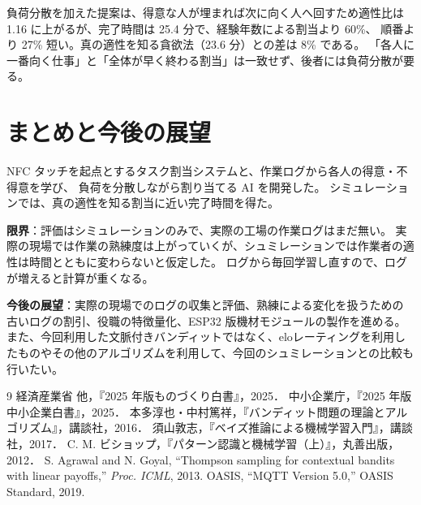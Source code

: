 \documentclass[a4paper,10pt,twocolumn,autodetect-engine,ja=standard]{bxjsarticle}
\begin{document}
負荷分散を加えた提案は、得意な人が埋まれば次に向く人へ回すため適性比は 1.16 に上がるが、完了時間は 25.4 分で、経験年数による割当より 60\%、
順番より 27\% 短い。真の適性を知る貪欲法（23.6 分）との差は 8\% である。
「各人に一番向く仕事」と「全体が早く終わる割当」は一致せず、後者には負荷分散が要る。

\section{まとめと今後の展望}
NFC タッチを起点とするタスク割当システムと、作業ログから各人の得意・不得意を学び、
負荷を分散しながら割り当てる AI を開発した。
シミュレーションでは、真の適性を知る割当に近い完了時間を得た。

\textbf{限界}：評価はシミュレーションのみで、実際の工場の作業ログはまだ無い。
実際の現場では作業の熟練度は上がっていくが、シュミレーションでは作業者の適性は時間とともに変わらないと仮定した。
ログから毎回学習し直すので、ログが増えると計算が重くなる。


\textbf{今後の展望}：実際の現場でのログの収集と評価、熟練による変化を扱うための
古いログの割引、役職の特徴量化、ESP32 版機材モジュールの製作を進める。
また、今回利用した文脈付きバンディットではなく、eloレーティングを利用したものやその他のアルゴリズムを利用して、今回のシュミレーションとの比較も行いたい。

\footnotesize
\begin{thebibliography}{9}\setlength{\itemsep}{0pt}
   経済産業省 他，『2025 年版ものづくり白書』，2025．
   中小企業庁，『2025 年版中小企業白書』，2025．
   本多淳也・中村篤祥，『バンディット問題の理論とアルゴリズム』，講談社，2016．
   須山敦志，『ベイズ推論による機械学習入門』，講談社，2017．
   C. M. ビショップ，『パターン認識と機械学習（上）』，丸善出版，2012．
   S. Agrawal and N. Goyal, ``Thompson sampling for contextual bandits with linear payoffs,'' \textit{Proc. ICML}, 2013.
   OASIS, ``MQTT Version 5.0,'' OASIS Standard, 2019.
\end{thebibliography}
\end{document}
